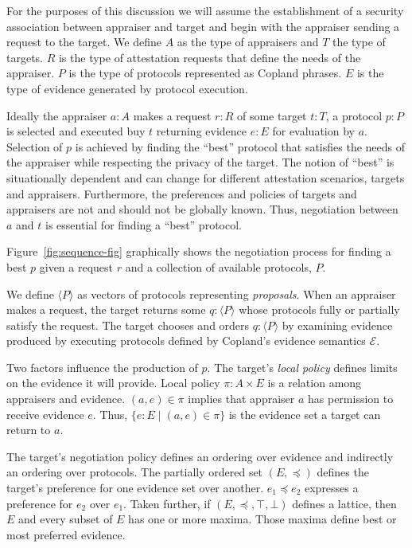 \documentclass[sigconf,authordraft]{acmart}
\begin{document}
For the purposes of this discussion we will assume the establishment
of a security association between appraiser and target and begin with
the appraiser sending a request to the target.  We define $A$ as the
type of appraisers and $T$ the type of targets.  $R$ is the type of
attestation requests that define the needs of the appraiser.  $P$ is
the type of protocols represented as Copland phrases.  $E$ is the type
of evidence generated by protocol execution.

Ideally the appraiser $a:A$ makes a request $r:R$ of some target
$t:T$, a protocol $p:P$ is selected and executed buy $t$ returning
evidence $e:E$ for evaluation by $a$.  Selection of $p$ is achieved by
finding the ``best'' protocol that satisfies the needs of the
appraiser while respecting the privacy of the target. The notion of
``best'' is situationally dependent and can change for different
attestation scenarios, targets and appraisers.  Furthermore, the
preferences and policies of targets and appraisers are not and should
not be globally known.  Thus, negotiation between $a$ and $t$ is
essential for finding a ``best'' protocol.

Figure~\ref{fig:sequence-fig} graphically shows the negotiation
process for finding a best $p$ given a request $r$ and a collection of
available protocols, $P$.

We define $\langle P \rangle$ as vectors of protocols representing
\emph{proposals}.  When an appraiser makes a request, the target
returns some $q:\langle P \rangle$ whose protocols fully or partially
satisfy the request. The target chooses and orders
$q:\langle P\rangle$ by examining evidence produced by executing
protocols defined by Copland's evidence semantics $\mathcal{E}$.

Two factors influence the production of $p$.  The target's \emph{local
  policy} defines limits on the evidence it will provide.  Local
policy $\pi : A\times E$ is a relation among appraisers and evidence.
$(a,e)\in\pi$ implies that appraiser $a$ has permission to receive
evidence $e$.  Thus, $\{e:E\mid (a,e)\in\pi\}$ is the evidence set a
target can return to $a$.

The target's negotiation policy defines an ordering over evidence and
indirectly an ordering over protocols.  The partially ordered set
$(E,\preceq)$ defines the target's preference for one evidence set
over another. $e_1\preceq e_2$ expresses a preference for $e_2$ over
$e_1$.  Taken further, if $(E,\preceq,\top,\bot)$ defines a lattice,
then $E$ and every subset of $E$ has one or more maxima.  Those maxima
define best or most preferred evidence.
\end{document}
